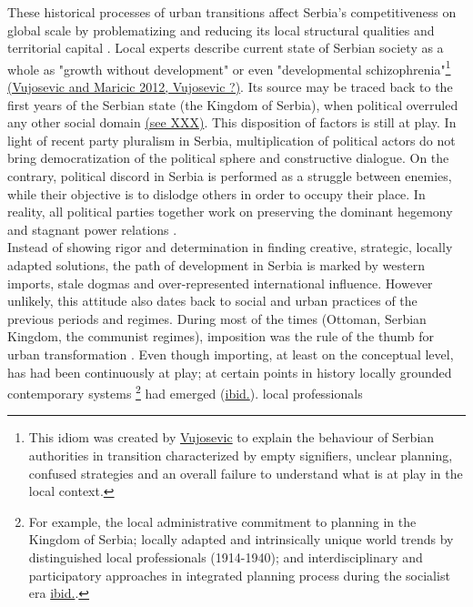 \documentclass[11pt]{report}
\begin{document}
These historical processes of urban transitions affect Serbia's competitiveness on global scale by problematizing and reducing its local structural qualities and territorial capital \href{}{\citealt{vujosevic_conundrum_2012}}. Local experts describe current state of Serbian society as a whole as "growth without development" or even "developmental schizophrenia"\footnote{This idiom was created by \href{}{Vujosevic} to explain the behaviour of Serbian authorities in transition characterized by empty signifiers, unclear planning, confused strategies and an overall failure to understand what is at play in the local context.} \href{}{(Vujosevic and Maricic 2012, Vujosevic ?)}.
Its source may be traced back to the first years of the Serbian state (the Kingdom of Serbia), when political overruled any other social domain \href{}{(see XXX)}. This disposition of factors is still at play. In light of recent party pluralism in Serbia, multiplication of political actors do not bring democratization of the political sphere and constructive dialogue. On the contrary, political discord in Serbia is performed as a struggle between enemies, while their objective is to dislodge others in order to occupy their place. In reality, all political parties together work on preserving the dominant hegemony and stagnant power relations \href{}{\citealt{mouffe_which_2002}}.
\\
Instead of showing rigor and determination in finding creative, strategic, locally adapted solutions, the path of development in Serbia is marked by western imports, stale dogmas and over-represented international influence. However unlikely, this attitude also dates back to social and urban practices of the previous periods and regimes. During most of the times (Ottoman, Serbian Kingdom, the communist regimes), imposition was the rule of the thumb for urban transformation \href{}{\citealt{nedovicbudic_waves_2006}}. Even though importing, at least on the conceptual level, has had been continuously at play; at certain points in history locally grounded contemporary systems
\footnote{For example, the local administrative commitment to planning in the Kingdom of Serbia; locally adapted and intrinsically unique world trends by distinguished local professionals (1914-1940); and interdisciplinary and participatory approaches in integrated planning process during the socialist era \href{}{ibid.}.} had emerged (\href{Nedovic}{ibid.}).
local professionals  
\\
\end{document}
